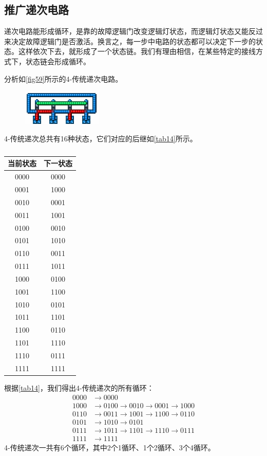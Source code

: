 \subsection{推广递次电路}
递次电路能形成循环，是靠的故障逻辑门改变逻辑灯状态，而逻辑灯状态又能反过来决定故障逻辑门是否激活。换言之，每一步中电路的状态都可以决定下一步的状态。这样依次下去，就形成了一个状态链。我们有理由相信，在某些特定的接线方式下，状态链会形成循环。

\begin{example}
分析如\autoref{fig59}所示的4-传统递次电路。
\begin{figure}[!ht]
\centering
\includegraphics{images/416.png}
\caption{}\label{fig59}
\end{figure}
\end{example}
\begin{solution}
4-传统递次总共有16种状态，它们对应的后继如\autoref{tab14}所示。
\begin{table}[!ht]
\centering
\begin{tabular}{|c|c|}
\hline
当前状态&下一状态\\\hline
0000&0000\\\hline
0001&1000\\\hline
0010&0001\\\hline
0011&1001\\\hline
0100&0010\\\hline
0101&1010\\\hline
0110&0011\\\hline
0111&1011\\\hline
1000&0100\\\hline
1001&1100\\\hline
1010&0101\\\hline
1011&1101\\\hline
1100&0110\\\hline
1101&1110\\\hline
1110&0111\\\hline
1111&1111\\\hline
\end{tabular}
\caption{}\label{tab14}
\end{table}

根据\autoref{tab14}，我们得出4-传统递次的所有循环：
\begin{align*}
0000&\to 0000\\
1000&\to 0100\to 0010\to 0001\to 1000\\
0110&\to 0011\to 1001\to 1100\to 0110\\
0101&\to 1010\to 0101\\
0111&\to 1011\to 1101\to 1110\to 0111\\
1111&\to 1111
\end{align*}
4-传统递次一共有6个循环，其中2个1循环、1个2循环、3个4循环。
\end{solution}

